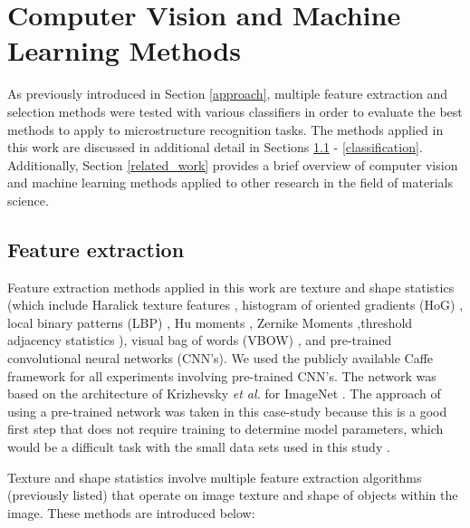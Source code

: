 \section{Computer Vision and Machine Learning Methods}
\label{methods}

As previously introduced in Section \ref{approach}, multiple feature extraction and selection methods were tested with various classifiers in order to evaluate the best methods to apply to microstructure recognition tasks.  The methods applied in this work are discussed in additional detail in Sections \ref{feature_extraction} - \ref{classification}.  Additionally, Section \ref{related_work} provides a brief overview of computer vision and machine learning methods applied to other research in the field of materials science. 

\subsection{Feature extraction}
\label{feature_extraction}

Feature extraction methods applied in this work are texture and shape statistics (which include Haralick texture features \cite{Haralick1973}, histogram of oriented gradients (HoG) \cite{Dalal2005}, local binary patterns (LBP) \cite{Ojala2002}, Hu moments \cite{Hu1962,Otsu1975}, Zernike Moments \cite{Khotanzad1990},threshold adjacency statistics \cite{Lievers2004}), visual bag of words (VBOW) \cite{Yang2007,Bay2006}, and pre-trained convolutional neural networks (CNN's).  We used the publicly available Caffe framework \cite{Jia2014} for all experiments involving pre-trained CNN's. The network was based on the architecture of Krizhevsky \textit{et al.} for ImageNet \cite{Krizhevsky2012}.  The approach of using a pre-trained network was taken in this case-study because this is a good first step that does not require training to determine model parameters, which would be a difficult task with the small data sets used in this study \cite{Jia2014}. 
  
Texture and shape statistics involve multiple feature extraction algorithms (previously listed) that operate on image texture and shape of objects within the image.  These methods are introduced below:   


